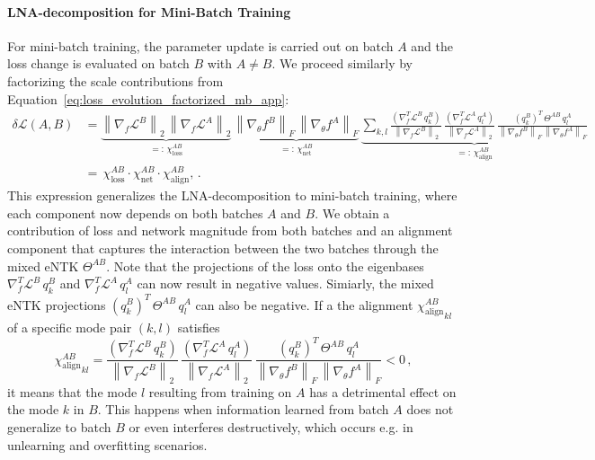 \paragraph{LNA-decomposition for Mini-Batch Training}
For mini-batch training, the parameter update is carried out on batch \(A\) and the loss change is evaluated on batch \(B\) with \(A \neq B\). We proceed similarly by factorizing the scale contributions from Equation~\ref{eq:loss_evolution_factorized_mb_app}:
\begin{align}
    \delta \mathcal{L}(A, B)
    &=\underbrace{\left\| \nabla_f \mathcal{L}^B \right\|_2 \, \left\| \nabla_f \mathcal{L}^A \right\|_2}_{=: \, \chi_{\text{loss}}^{A B}} \,
    \underbrace{\left\| \nabla_\theta f^B \right\|_F \, \left\| \nabla_\theta f^A \right\|_F}_{=: \, \chi_{\text{net}}^{A B}} \,
    \underbrace{\sum_{k, l} \frac{ (\nabla_f^T \mathcal{L}^B \, q_k^B) }{\left\| \nabla_f \mathcal{L}^B \right\|_2} \,\frac{ (\nabla_f^T \mathcal{L}^A \, q_l^A) }{\left\| \nabla_f \mathcal{L}^A \right\|_2} \, \frac{ (q_k^B)^T \, \Theta^{A B} \, q_l^A }{\left\| \nabla_\theta f^B \right\|_F \, \left\| \nabla_\theta f^A \right\|_F}}_{=: \, \chi_{\text{align}}^{A B}} \nonumber \\
    &= \, \chi_{\text{loss}}^{A B} \cdot \chi_{\text{net}}^{A B} \cdot \chi_{\text{align}}^{A B}, 
    \, .
    \label{eq:loss_evolution_factorized_mb_final_app}
\end{align}
This expression generalizes the LNA-decomposition to mini-batch training, where each component now depends on both batches \(A\) and \(B\).
We obtain a contribution of loss and network magnitude from both batches and an alignment component that captures the interaction between the two batches through the mixed eNTK \(\Theta^{A B}\).
Note that the projections of the loss onto the eigenbases \( \nabla_f^T \mathcal{L}^B \, q_k^B \) and \( \nabla_f^T \mathcal{L}^A \, q_l^A \) can now result in negative values. Simiarly, the mixed eNTK projections \( (q_k^B)^T \, \Theta^{A B} \, q_l^A \) can also be negative.
If a the alignment \( {\chi_{\text{align}}^{A B}}_{k l} \) of a specific mode pair \((k, l)\) satisfies
\begin{equation}
    {\chi_{\text{align}}^{A B}}_{k l} =
    \frac{ (\nabla_f^T \mathcal{L}^B \, q_k^B) }{\left\| \nabla_f \mathcal{L}^B \right\|_2} \,\frac{ (\nabla_f^T \mathcal{L}^A \, q_l^A) }{\left\| \nabla_f \mathcal{L}^A \right\|_2} \, \frac{ (q_k^B)^T \, \Theta^{A B} \, q_l^A }{\left\| \nabla_\theta f^B \right\|_F \, \left\| \nabla_\theta f^A \right\|_F} < 0 \, ,
\end{equation}
it means that the mode \(l\) resulting from training on \(A\) has a detrimental effect on the mode \(k\) in \(B\). This happens when information learned from batch \(A\) does not generalize to batch \(B\) or even interferes destructively, which occurs e.g. in unlearning and overfitting scenarios.

